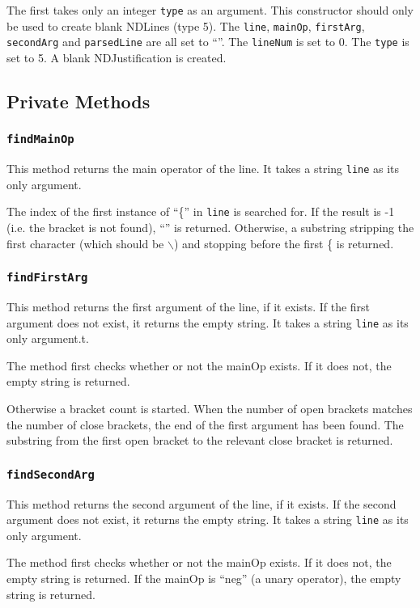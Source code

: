 \documentclass[a4paper]{article}
\begin{document}
The first takes only an integer \texttt{type} as an argument. This constructor should only be used to create blank NDLines (type 5). The \texttt{line}, \texttt{mainOp}, \texttt{firstArg}, \texttt{secondArg} and \texttt{parsedLine} are all set to ``''. The \texttt{lineNum} is set to 0. The \texttt{type} is set to 5. A blank NDJustification is created.

\subsection{Private Methods}

\subsubsection{\texttt{findMainOp}}
This method returns the main operator of the line. It takes a string \texttt{line} as its only argument.

The index of the first instance of ``\{'' in \texttt{line} is searched for. If the result is -1 (i.e. the bracket is not found), ``'' is returned. Otherwise, a substring stripping the first character (which should be $\backslash$) and stopping before the first \{ is returned.

\subsubsection{\texttt{findFirstArg}}
This method returns the first argument of the line, if it exists. If the first argument does not exist, it returns the empty string. It takes a string \texttt{line} as its only argument.t.

The method first checks whether or not the mainOp exists. If it does not, the empty string is returned.

Otherwise a bracket count is started. When the number of open brackets matches the number of close brackets, the end of the first argument has been found. The substring from the first open bracket to the relevant close bracket is returned.

\subsubsection{\texttt{findSecondArg}}
This method returns the second argument of the line, if it exists. If the second argument does not exist, it returns the empty string. It takes a string \texttt{line} as its only argument.

The method first checks whether or not the mainOp exists. If it does not, the empty string is returned. If the mainOp is ``neg'' (a unary operator), the empty string is returned.
\end{document}
